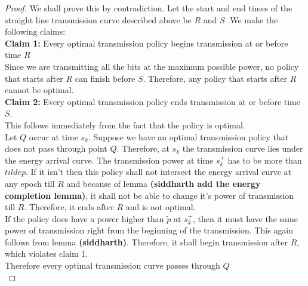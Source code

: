 \begin{proof}
We shall prove this by contradiction. Let the start and end times of the straight line transmission curve described above be $R$ and $S$ .We make the following claims:\\
\textbf{Claim 1:} Every optimal transmission policy begins transmission at or before time $R$\\
Since we are transmitting all the bits at the maximum possible power, no policy that starts after $R$ can finish before $S$. Therefore, any policy that starts after $R$ cannot be optimal.\\
\textbf{Claim 2:} Every optimal transmission policy ends transmission at or before time $S$.\\
This follows immediately from the fact that the policy is optimal. \\
Let $Q$ occur at time $s_k$. Suppose we have an optimal transmission policy that does not pass through point $Q$. Therefore, at $s_k$ the transmission curve lies under the energy arrival curve. The transmission power at time $s_k^+$ has to be more than $tilde{p}$. If it isn't then this policy shall not intersect the energy arrival curve at any epoch till $R$ and because of lemma \textbf{(siddharth add the energy completion lemma)}, it shall not be able to change it's power of transmission till $R$. Therefore, it ends after $R$ and is not optimal.\\
If the policy does have a power higher than $\tilde{p}$ at $s_k^+$, then it must have the same power of transmission right from the beginning of the transmission. This again follows from lemma \textbf{(siddharth)}. Therefore, it shall begin transmission after $R$, which violates claim 1. \\
Therefore every optimal transmission curve passes through $Q$\\
\end{proof}


